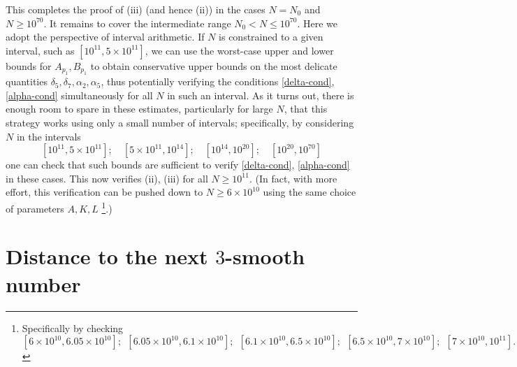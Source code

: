 \documentclass[12pt,a4paper,reqno]{amsart}
\numberwithin{equation}{section}
\theoremstyle{plain}
\theoremstyle{definition}
\begin{document}
This completes the proof of (iii) (and hence (ii)) in the cases $N=N_0$ and $N \geq 10^{70}$.  It remains to cover the intermediate range $N_0 < N \leq 10^{70}$.  Here we adopt the perspective of interval arithmetic.  If $N$ is constrained to a given interval, such as $[10^{11}, 5 \times 10^{11}]$, we can use the worst-case upper and lower bounds for $A_{p_1}, B_{p_1}$ to obtain conservative upper bounds on the most delicate quantities
$\delta_5, \delta_7, \alpha_2, \alpha_5$, thus potentially verifying the conditions \eqref{delta-cond}, \eqref{alpha-cond} simultaneously for all $N$ in such an interval.  As it turns out, there is enough room to spare in these estimates, particularly for large $N$, that this strategy works using only a small number of intervals; specifically, by considering $N$ in the intervals
$$ [10^{11}, 5 \times 10^{11}]; \quad [5 \times 10^{11}, 10^{14}]; \quad [10^{14}, 10^{20}]; \quad [10^{20}, 10^{70}]$$
one can check that such bounds are sufficient to verify \eqref{delta-cond}, \eqref{alpha-cond} in these cases.  This now verifies (ii), (iii) for all $N \geq 10^{11}$.
(In fact, with more effort, this verification can be pushed down to $N \geq 6 \times 10^{10}$ using the same choice of parameters $A,K,L$ \footnote{Specifically by checking $$ [6 \times 10^{10}, 6.05 \times 10^{10}]; \ \  [6.05 \times 10^{10}, 6.1 \times 10^{10}]; \ \  [6.1 \times 10^{10}, 6.5 \times 10^{10}]; \ \  [6.5 \times 10^{10}, 7 \times 10^{10}]; \ \  [7 \times 10^{10}, 10^{11}].$$}.)
  
\appendix

\section{Distance to the next \texorpdfstring{$3$}{3}-smooth number}\label{power-sec}
\end{document}
